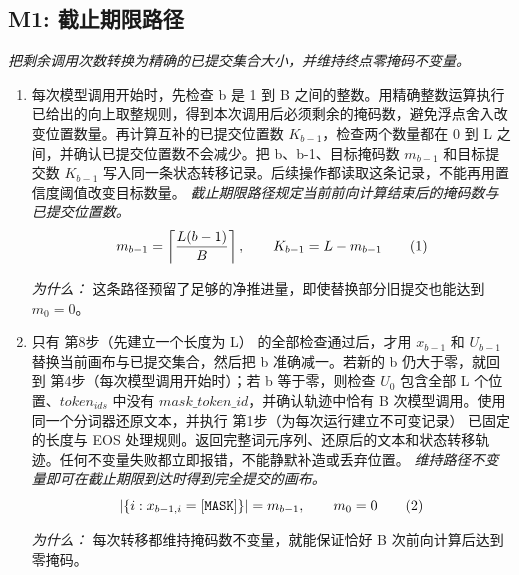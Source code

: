\documentclass[10pt,a4paper]{article}
\begin{document}
\subsection*{M1: 截止期限路径}
\emph{把剩余调用次数转换为精确的已提交集合大小，并维持终点零掩码不变量。}
\begin{enumerate}[leftmargin=*,start=4]
  \item 每次模型调用开始时，先检查 b 是 1 到 B 之间的整数。用精确整数运算执行已给出的向上取整规则，得到本次调用后必须剩余的掩码数，避免浮点舍入改变位置数量。再计算互补的已提交位置数 \(K_{b-1}\)，检查两个数量都在 0 到 L 之间，并确认已提交位置数不会减少。把 b、b-1、目标掩码数 \(m_{b-1}\) 和目标提交数 \(K_{b-1}\) 写入同一条状态转移记录。后续操作都读取这条记录，不能再用置信度阈值改变目标数量。
\noindent\emph{截止期限路径规定当前前向计算结束后的掩码数与已提交位置数。}
\begin{equation}
\resizebox{\ifdim\width>\linewidth \linewidth\else\width\fi}{!}{$\displaystyle m_{b-1}=\left\lceil \frac{L(b-1)}{B} \right\rceil,\qquad K_{b-1}=L-m_{b-1}$} \tag{1}
\end{equation}
\par\emph{为什么：} 这条路径预留了足够的净推进量，即使替换部分旧提交也能达到 \(m_{0}=0\)。
  \item 只有 第8步（先建立一个长度为 L） 的全部检查通过后，才用 \(x_{b-1}\) 和 \(U_{b-1}\) 替换当前画布与已提交集合，然后把 b 准确减一。若新的 b 仍大于零，就回到 第4步（每次模型调用开始时）；若 b 等于零，则检查 \(U_{0}\) 包含全部 L 个位置、\(token_{ids}\) 中没有 \(\mathit{mask\_token\_id}\)，并确认轨迹中恰有 B 次模型调用。使用同一个分词器还原文本，并执行 第1步（为每次运行建立不可变记录） 已固定的长度与 EOS 处理规则。返回完整词元序列、还原后的文本和状态转移轨迹。任何不变量失败都立即报错，不能静默补造或丢弃位置。
\noindent\emph{维持路径不变量即可在截止期限到达时得到完全提交的画布。}
\begin{equation}
\resizebox{\ifdim\width>\linewidth \linewidth\else\width\fi}{!}{$\displaystyle |\{i:x_{b-1,i}=\mathtt{[MASK]}\}|=m_{b-1},\qquad m_0=0$} \tag{2}
\end{equation}
\par\emph{为什么：} 每次转移都维持掩码数不变量，就能保证恰好 B 次前向计算后达到零掩码。
\end{enumerate}
\end{document}
